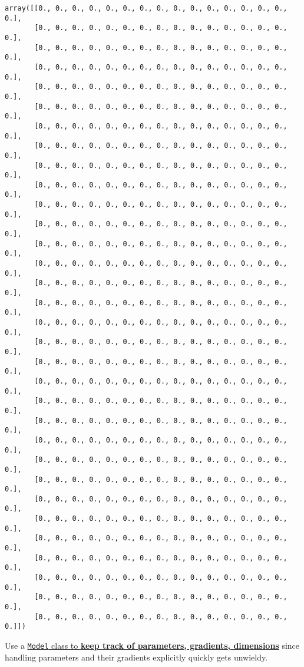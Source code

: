 \documentclass[
]{article}
\begin{document}
\begin{verbatim}
array([[0., 0., 0., 0., 0., 0., 0., 0., 0., 0., 0., 0., 0., 0., 0., 0.],
       [0., 0., 0., 0., 0., 0., 0., 0., 0., 0., 0., 0., 0., 0., 0., 0.],
       [0., 0., 0., 0., 0., 0., 0., 0., 0., 0., 0., 0., 0., 0., 0., 0.],
       [0., 0., 0., 0., 0., 0., 0., 0., 0., 0., 0., 0., 0., 0., 0., 0.],
       [0., 0., 0., 0., 0., 0., 0., 0., 0., 0., 0., 0., 0., 0., 0., 0.],
       [0., 0., 0., 0., 0., 0., 0., 0., 0., 0., 0., 0., 0., 0., 0., 0.],
       [0., 0., 0., 0., 0., 0., 0., 0., 0., 0., 0., 0., 0., 0., 0., 0.],
       [0., 0., 0., 0., 0., 0., 0., 0., 0., 0., 0., 0., 0., 0., 0., 0.],
       [0., 0., 0., 0., 0., 0., 0., 0., 0., 0., 0., 0., 0., 0., 0., 0.],
       [0., 0., 0., 0., 0., 0., 0., 0., 0., 0., 0., 0., 0., 0., 0., 0.],
       [0., 0., 0., 0., 0., 0., 0., 0., 0., 0., 0., 0., 0., 0., 0., 0.],
       [0., 0., 0., 0., 0., 0., 0., 0., 0., 0., 0., 0., 0., 0., 0., 0.],
       [0., 0., 0., 0., 0., 0., 0., 0., 0., 0., 0., 0., 0., 0., 0., 0.],
       [0., 0., 0., 0., 0., 0., 0., 0., 0., 0., 0., 0., 0., 0., 0., 0.],
       [0., 0., 0., 0., 0., 0., 0., 0., 0., 0., 0., 0., 0., 0., 0., 0.],
       [0., 0., 0., 0., 0., 0., 0., 0., 0., 0., 0., 0., 0., 0., 0., 0.],
       [0., 0., 0., 0., 0., 0., 0., 0., 0., 0., 0., 0., 0., 0., 0., 0.],
       [0., 0., 0., 0., 0., 0., 0., 0., 0., 0., 0., 0., 0., 0., 0., 0.],
       [0., 0., 0., 0., 0., 0., 0., 0., 0., 0., 0., 0., 0., 0., 0., 0.],
       [0., 0., 0., 0., 0., 0., 0., 0., 0., 0., 0., 0., 0., 0., 0., 0.],
       [0., 0., 0., 0., 0., 0., 0., 0., 0., 0., 0., 0., 0., 0., 0., 0.],
       [0., 0., 0., 0., 0., 0., 0., 0., 0., 0., 0., 0., 0., 0., 0., 0.],
       [0., 0., 0., 0., 0., 0., 0., 0., 0., 0., 0., 0., 0., 0., 0., 0.],
       [0., 0., 0., 0., 0., 0., 0., 0., 0., 0., 0., 0., 0., 0., 0., 0.],
       [0., 0., 0., 0., 0., 0., 0., 0., 0., 0., 0., 0., 0., 0., 0., 0.],
       [0., 0., 0., 0., 0., 0., 0., 0., 0., 0., 0., 0., 0., 0., 0., 0.],
       [0., 0., 0., 0., 0., 0., 0., 0., 0., 0., 0., 0., 0., 0., 0., 0.],
       [0., 0., 0., 0., 0., 0., 0., 0., 0., 0., 0., 0., 0., 0., 0., 0.],
       [0., 0., 0., 0., 0., 0., 0., 0., 0., 0., 0., 0., 0., 0., 0., 0.],
       [0., 0., 0., 0., 0., 0., 0., 0., 0., 0., 0., 0., 0., 0., 0., 0.],
       [0., 0., 0., 0., 0., 0., 0., 0., 0., 0., 0., 0., 0., 0., 0., 0.],
       [0., 0., 0., 0., 0., 0., 0., 0., 0., 0., 0., 0., 0., 0., 0., 0.]])
\end{verbatim}

Use a
\href{https://hyp.is/si5GiE5NEeqQF1_W9FWCsQ/thinc.ai/docs/concept}{\texttt{Model}
class to \textbf{keep track of parameters, gradients, dimensions}} since
handling parameters and their gradients explicitly quickly gets
unwieldy.
\end{document}
